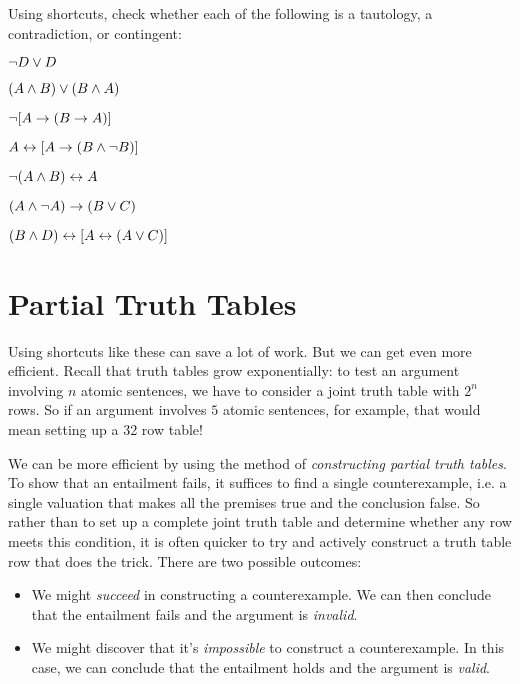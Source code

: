 \practiceproblems
\problempart
Using shortcuts, check whether each of the following is a tautology, a contradiction, or contingent:
\begin{earg}
	\item $\neg D \vee D$ %
	\item $(A\wedge B) \vee (B\wedge A)$ %
	\item $\neg[A \rightarrow (B \rightarrow A)]$ %
	\item $A \leftrightarrow [A \rightarrow (B \wedge \neg B)]$ %
	\item $\neg(A\wedge B) \leftrightarrow A$ %
	\item $(A \wedge\neg A) \rightarrow (B \vee C)$ %
	\item $(B\wedge D) \leftrightarrow [A \leftrightarrow(A \vee C)]$%
\end{earg}




\section{Partial Truth Tables}\label{s:PartTTableEnt}

Using shortcuts like these can save a lot of work.  But we can get even more efficient. Recall that truth tables grow exponentially: to test an argument involving $n$ atomic sentences, we have to consider a joint truth table with $2^n$ rows. So if an argument involves $5$ atomic sentences, for example, that would mean setting up a 32 row table!

We can be more efficient by using the method of \emph{constructing partial truth tables}.  To show that an entailment fails, it suffices to find a single counterexample, i.e. a single valuation that makes all the premises true and the conclusion false.  So rather than to set up a complete joint truth table and determine whether any row meets this condition, it is often quicker to try and actively construct a truth table row that does the trick.  There are two possible outcomes:

\begin{itemize}
\item We might \emph{succeed} in constructing a counterexample.  We can then conclude that the entailment fails and the argument is \emph{invalid}.

\item We might discover that it's \emph{impossible} to construct a counterexample.  In this case, we can conclude that the entailment holds and the argument is \emph{valid}.
\end{itemize}


